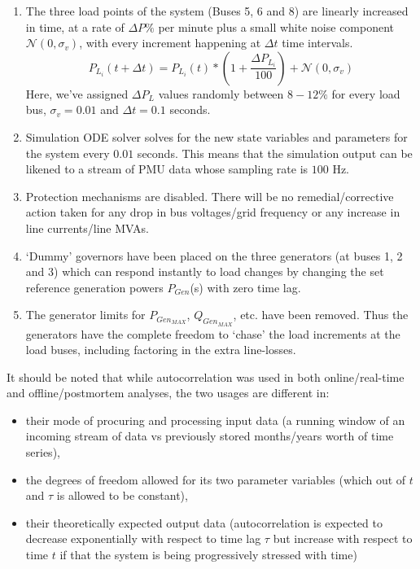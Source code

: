 \begin{enumerate}
	\item The three load points of the system (Buses 5, 6 and 8) are linearly increased in time, at a rate of $\Delta P \%$ per minute plus a small white noise component $\mathcal{N}(0, \sigma_v)$, with every increment happening at $\Delta t$ time intervals. 
	\begin{equation}
		P_{L_i}(t+\Delta t) = P_{L_i}(t)*\left(1+ \frac{\Delta P_{L_i}}{100}\right) + \mathcal{N}(0, \sigma_v)
	\end{equation} 
	Here, we've assigned $\Delta P_{L}$ values randomly between $8-12\%$ for every load bus, $\sigma_v = 0.01$ and $\Delta t = 0.1$ seconds.
	\item Simulation ODE solver solves for the new state variables and parameters for the system every $0.01$ seconds. This means that the simulation output can be likened to a stream of PMU data whose sampling rate is $100$ Hz.
	\item Protection mechanisms are disabled. There will be no remedial/corrective action taken for any drop in bus voltages/grid frequency or any increase in line currents/line MVAs.
	\item `Dummy' governors have been placed on the three generators (at buses 1, 2 and 3) which can respond instantly to load changes by changing the set reference generation powers $P_{Gen}$(s) with zero time lag.
	\item The generator limits for $P_{Gen_{MAX}}$, $Q_{Gen_{MAX}}$, etc. have been removed. Thus the generators have the complete freedom to `chase' the load increments at the load buses, including factoring in the extra line-losses.
\end{enumerate} 

It should be noted that while autocorrelation was used in both online/real-time and offline/postmortem analyses, the two usages are different in:

\begin{itemize}
	\item their mode of procuring and processing input data (a running window of an incoming stream of data vs previously stored months/years worth of time series),
	\item the degrees of freedom allowed for its two parameter variables (which out of $t$ and $\tau$ is allowed to be constant),
	\item their theoretically expected output data (autocorrelation is expected to decrease exponentially with respect to time lag $\tau$ but increase with respect to time $t$ if that the system is being progressively stressed with time)
\end{itemize} 
 